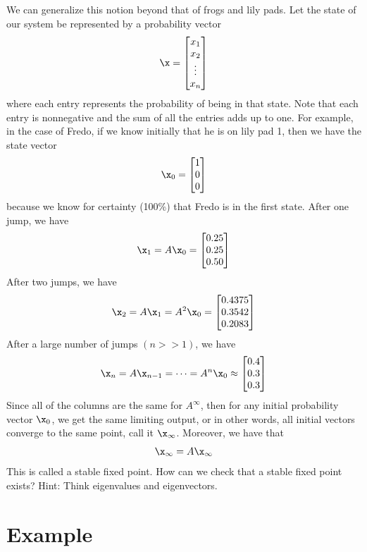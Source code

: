 We can generalize this notion beyond that of frogs and lily pads.
Let the state of our system be represented by a probability vector
\[
\x = \begin{bmatrix}
x_1\\
x_2\\
\vdots\\
x_n
\end{bmatrix}
\]
where each entry represents the probability of being in that state.
Note that each entry is nonnegative and the sum of all the entries adds up to one.
For example, in the case of Fredo, if we know initially that he is on lily pad 1, then we have the state vector
\[
\x_0 = \begin{bmatrix}
1\\
0\\
0
\end{bmatrix}
\]
because we know for certainty (100\%) that Fredo is in the first state.
After one jump, we have
\[
\x_1 = A \x_0 = \begin{bmatrix}
0.25\\
0.25\\
0.50
\end{bmatrix}
\]
After two jumps, we have
\[
\x_2 = A \x_1 = A^2 \x_0 = \begin{bmatrix}
0.4375\\
0.3542\\
0.2083
\end{bmatrix}
\]
After a large number of jumps $(n>>1)$, we have
\[
\x_n = A \x_{n-1} = \dots = A^n \x_0 \approx \begin{bmatrix}
0.4\\
0.3\\
0.3
\end{bmatrix}
\]
Since all of the columns are the same for $A^\infty$, then for any initial probability vector $\x_0$, we get the same limiting output, or in other words, all initial vectors converge to the same point, call it $\x_\infty$.
Moreover, we have that
\[
\x_\infty = A \x_\infty
\]
This is called a stable fixed point.
How can we check that a stable fixed point exists?
Hint: Think eigenvalues and eigenvectors.

\section*{Example}

